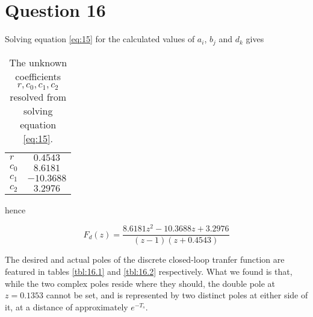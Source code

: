 \section{Question 16}

Solving equation \ref{eq:15} for the calculated values of $a_i$, $b_j$ and $d_k$
gives

\begin{table}[H]\centering
  \begin{tabular}{l|c}
  $r$     & $0.4543$    \\
  $c_0$   & $8.6181$    \\
  $c_1$   & $-10.3688$  \\
  $c_2$   & $3.2976$    \\
  \end{tabular}
  \caption{The unknown coefficients $r, c_0, c_1, c_2$ resolved from solving
    equation \ref{eq:15}.}
  \label{tbl:16}
\end{table}

hence

\begin{equation}
  F_d(z) = \dfrac{8.6181z^2 -10.3688z + 3.2976}{(z-1)(z+0.4543)}
\end{equation}

The desired and actual poles of the discrete closed-loop tranfer function are
featured in tables \ref{tbl:16.1} and \ref{tbl:16.2} respectively. What we found
is that, while the two complex poles reside where they should, the double pole
at $z=0.1353$ cannot be set, and is represented by two distinct poles at either
side of it, at a distance of approximately $e^{-T_s}$.

\begin{table}
\centering
{}
\end{table}
